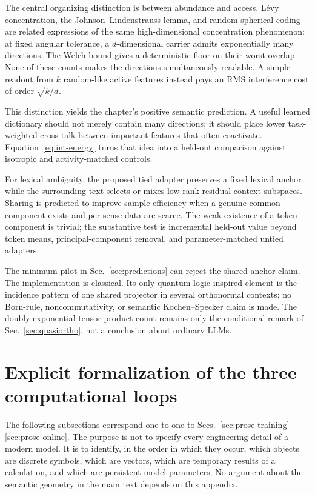 \documentclass[
  aps,
  reprint,
  superscriptaddress,
  floatfix,
  nofootinbib,
  longbibliography
]{revtex4-2}
\begin{document}
The central organizing distinction is between abundance and access.
L\'evy concentration,
the Johnson--Lindenstrauss lemma, and random spherical coding are related
expressions of the same high-dimensional concentration phenomenon: at fixed
angular tolerance, a $d$-dimensional carrier admits exponentially many
directions.  The Welch bound gives a deterministic floor on their worst
overlap.  None of these counts makes the directions simultaneously readable.
A simple readout from $k$ random-like active features instead pays an RMS
interference cost of order $\sqrt{k/d}$.

This distinction yields the chapter's positive semantic prediction.  A useful
learned dictionary should not merely contain many directions; it should place
lower task-weighted cross-talk between important features that often
coactivate.  Equation~\eqref{eq:int-energy} turns that idea into a held-out
comparison against isotropic and activity-matched controls.

For lexical ambiguity, the proposed tied adapter preserves a fixed lexical
anchor while the surrounding text selects or mixes low-rank residual context
subspaces.  Sharing is predicted to improve sample efficiency when a genuine
common component exists and per-sense data are scarce.  The weak existence of
a token component is trivial; the substantive test is incremental held-out
value beyond token means, principal-component removal, and parameter-matched
untied adapters.

The minimum pilot in Sec.~\ref{sec:predictions} can reject the shared-anchor
claim.  The implementation is classical.  Its only quantum-logic-inspired
element is the incidence pattern of one shared projector in several
orthonormal contexts; no Born-rule, noncommutativity, or semantic
Kochen--Specker claim is made.
The doubly exponential tensor-product count remains only the conditional
remark of Sec.~\ref{sec:quasiortho}, not a conclusion about ordinary LLMs.

\appendix

\section{Explicit formalization of the three computational loops}
\label{app:llm-loops}

The following subsections correspond one-to-one to
Secs.~\ref{sec:prose-training}--\ref{sec:prose-online}.  The purpose is not to
specify every engineering detail of a modern model.  It is to identify, in the
order in which they occur, which objects are discrete symbols, which are
vectors, which are temporary results of a calculation, and which are persistent
model parameters.  No argument about the semantic geometry in the main text
depends on this appendix.
\end{document}
